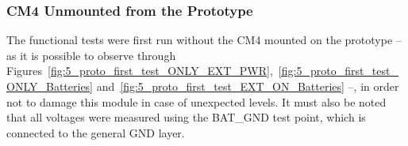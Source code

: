 \subsubsection{CM4 Unmounted from the Prototype}\label{sec:5331_CM4_UNmounted}

The functional tests were first run without the CM4 mounted on the prototype -- as it is possible to observe through Figures~\ref{fig:5_proto_first_test_ONLY_EXT_PWR},~\ref{fig:5_proto_first_test_ONLY_Batteries} and~\ref{fig:5_proto_first_test_EXT_ON_Batteries} --, in order not to damage this module in case of unexpected levels. It must also be noted that all voltages were measured using the BAT\_GND test point, which is connected to the general GND layer.


\begingroup
\begin{table}[H]
	\caption{LTC4012 circuit's most relevant voltages expected and measured, for all operational modes, with the CM4 unmounted from the prototype.}
	\label{tab:LTC4012_3_modes_NO_CM4}
	\centering
\end{table}
\endgroup%

